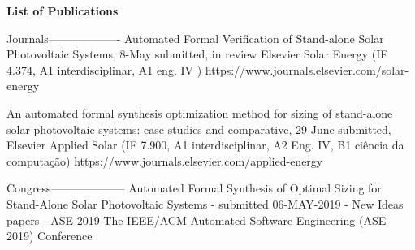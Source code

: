 \textbf{List of Publications}

Journals-------------------
Automated Formal Verification of Stand-alone Solar Photovoltaic Systems, 8-May submitted, in review Elsevier Solar Energy (IF 4.374, A1 interdisciplinar, A1 eng. IV ) https://www.journals.elsevier.com/solar-energy

An automated formal synthesis optimization method for sizing of stand-alone solar photovoltaic systems: case studies and comparative, 29-June submitted, Elsevier Applied Solar (IF 7.900, A1 interdisciplinar, A2 Eng. IV, B1 ciência da computação) https://www.journals.elsevier.com/applied-energy

Congress--------------------
Automated Formal Synthesis of Optimal Sizing for Stand-Alone Solar Photovoltaic Systems - submitted 06-MAY-2019 - New Ideas papers - ASE 2019 The IEEE/ACM Automated Software Engineering (ASE 2019) Conference